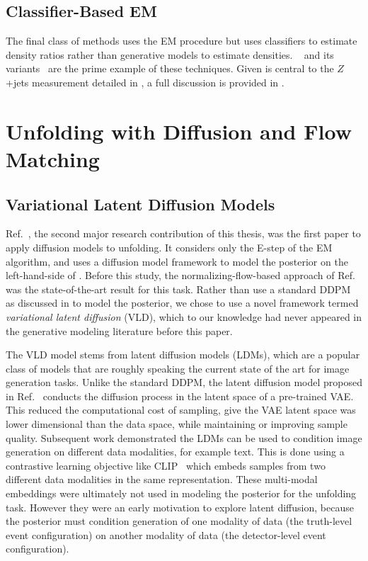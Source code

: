 \subsection{Classifier-Based EM}
\label{sec:omnifold-preview}

The final class of methods uses the EM procedure but uses classifiers to estimate density ratios rather than generative models to estimate densities.
\Omnifold~\cite{Andreassen:2019cjw} and its variants~\cite{Chan:2023tbf, Zhu:2024drd} are the prime example of these techniques.
Given \Omnifold is central to the $Z$+jets measurement detailed in , a full discussion is provided in .

\section{Unfolding with Diffusion and Flow Matching}
\label{sec:diffusion-unfolding}

\subsection{Variational Latent Diffusion Models}
\label{sec:vld-unfolding}

Ref.~\cite{Shmakov:2023kjj}, the second major research contribution of this thesis, was the first paper to apply diffusion models to unfolding.
It considers only the E-step of the EM algorithm, and uses a diffusion model framework to model the posterior on the left-hand-side of .
Before this study, the normalizing-flow-based approach of Ref.~\cite{Bellagente:2020piv} was the state-of-the-art result for this task.
Rather than use a standard DDPM as discussed in  to model the posterior, we chose to use a novel framework termed \textit{variational latent diffusion} (VLD), which to our knowledge had never appeared in the generative modeling literature before this paper.

The VLD model stems from latent diffusion models (LDMs), which are a popular class of models that are roughly speaking the current state of the art for image generation tasks.
Unlike the standard DDPM, the latent diffusion model proposed in Ref.~\cite{rombach2022high} conducts the diffusion process in the latent space of a pre-trained VAE.
This reduced the computational cost of sampling, give the VAE latent space was lower dimensional than the data space, while maintaining or improving sample quality.
Subsequent work demonstrated the LDMs can be used to condition image generation on different data modalities, for example text.
This is done using a contrastive learning objective like CLIP~\cite{radford2021learning} which embeds samples from two different data modalities in the same representation.
These multi-modal embeddings were ultimately not used in modeling the posterior for the unfolding task.
However they were an early motivation to explore latent diffusion, because the posterior must condition generation of one modality of data (the truth-level event configuration) on another modality of data (the detector-level event configuration).


